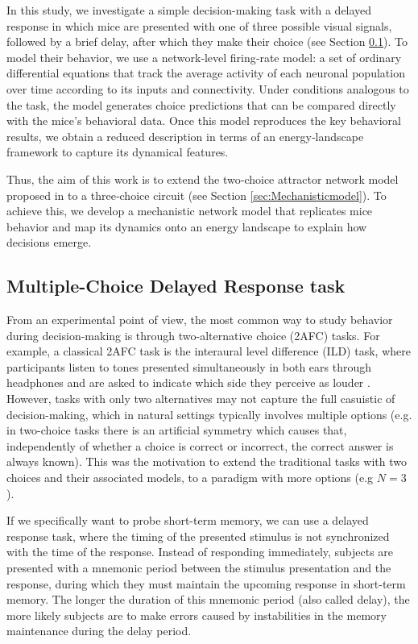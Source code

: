 \documentclass[12,twoside]{TFG-GM}
\theoremstyle{definition}
\theoremstyle{remark}
\begin{document}
In this study, we investigate a simple decision-making task with a delayed response in which mice are presented with one of three possible visual signals, followed by a brief delay, after which they make their choice (see Section \ref{sec:MCDR}). To model their behavior, we use a network‐level firing‐rate model: a set of ordinary differential equations that track the average activity of each neuronal population over time according to its inputs and connectivity. Under conditions analogous to the task, the model generates choice predictions that can be compared directly with the mice’s behavioral data. Once this model reproduces the key behavioral results, we obtain a reduced description in terms of an energy‐landscape framework to capture its dynamical features.

Thus, the aim of this work is to extend the two‐choice attractor network model proposed in \cite{inagaki2019} to a three‐choice circuit (see Section \ref{sec:Mechanisticmodel}). To achieve this, we develop a mechanistic network model that replicates mice behavior and map its dynamics onto an energy landscape to explain how decisions emerge.



\subsection{Multiple-Choice Delayed Response task}
\label{sec:MCDR}
From an experimental point of view, the most common way to study behavior during decision-making is through two-alternative choice (2AFC) tasks. For example, a classical 2AFC task is the interaural level difference (ILD) task, where participants listen to tones presented simultaneously in both ears through headphones and are asked to indicate which side they perceive as louder \cite{hermoso-mendizabal2020}. However, tasks with only two alternatives may not capture the full casuistic of decision-making, which in natural settings typically involves multiple options (e.g. in two-choice tasks there is an artificial symmetry which causes that, independently of whether a choice is correct or incorrect, the correct answer is always known). This was the motivation to extend the traditional tasks with two choices and their associated models, to a paradigm with more options (e.g $N = 3$).

If we specifically want to probe short-term memory, we can use a delayed response task, where the timing of the presented stimulus is not synchronized with the time of the response. Instead of responding immediately, subjects are presented with a mnemonic period between the stimulus presentation and the response, during which they must maintain the upcoming response in short-term memory. The longer the duration of this mnemonic period (also called delay), the more likely subjects are to make errors caused by instabilities in the memory maintenance during the delay period. 
\end{document}
